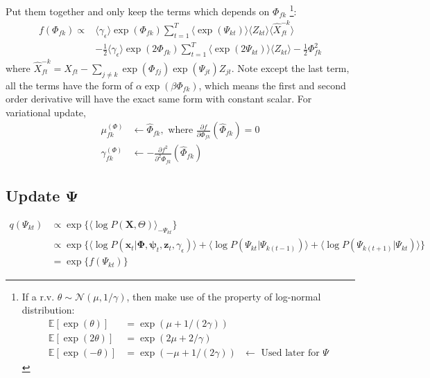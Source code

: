 \documentclass[11pt]{article} %
\begin{document}
Put them together and only keep the terms which depends on $\Phi_{fk}$ \footnote{If a r.v. $\theta \sim \mathcal{N}(\mu, 1/\gamma)$, then make use of the property of log-normal distribution:
\begin{align*}
\mathbb{E}[\exp(\theta)]  &= \exp(\mu + 1/(2\gamma))\\
\mathbb{E}[\exp(2\theta)] &= \exp(2\mu + 2/\gamma)\\
\mathbb{E}[\exp(-\theta)] &= \exp(-\mu + 1/(2\gamma)) \text{ $\leftarrow$ Used later for $\Psi$}
\end{align*}
}:
\begin{align*}
f(\Phi_{fk}) \propto & \langle \gamma_{\epsilon} \rangle \exp(\Phi_{fk}) \sum_{t=1}^T \langle \exp(\Psi_{kt}) \rangle \langle Z_{kt} \rangle
\langle \hat{X}_{ft}^{-k} \rangle \\
& -\frac{1}{2}  \langle \gamma_{\epsilon} \rangle \exp(2\Phi_{fk}) \sum_{t=1}^T \langle \exp(2\Psi_{kt}) \rangle \langle Z_{kt} \rangle - \frac{1}{2}\Phi_{fk}^2
\end{align*}
where $\hat{X}_{ft}^{-k}  = X_{ft} - \sum_{j\neq k}  \exp(\Phi_{fj}) \exp(\Psi_{jt}) Z_{jt}$. Note except the last term, all the terms have the form of $\alpha\exp(\beta \Phi_{fk})$, which means the first and second order derivative will have the exact same form with constant scalar. For variational update,
\begin{align*}
\mu_{fk}^{(\Phi)} &\leftarrow \hat{\Phi}_{fk}, \text{ where }  \frac{\partial f}{\partial \Phi_{fk}} (\hat{\Phi}_{fk}) = 0 \\
\gamma_{fk}^{(\Phi)} &\leftarrow -\frac{\partial f^2}{\partial^2 \Phi_{fk}} (\hat{\Phi}_{fk})
\end{align*}


\subsection{Update $\mathbf{\Psi}$}
\begin{align*}
q(\Psi_{kt}) &\propto \exp\{\langle\log P(\mathbf{X}, \Theta)\rangle_{-\Psi_{kt}}\}\\
&\propto \exp\{\langle \log P(\bm{x}_t | \mathbf{\Phi}, \bm{\psi}_t, \mathbf{z}_t, \gamma_\epsilon)\rangle + \langle \log P(\Psi_{kt} | \Psi_{k(t-1)}) \rangle + \langle \log P(\Psi_{k(t+1)} | \Psi_{kt}) \rangle\}\\
&= \exp\{f(\Psi_{kt})\}
\end{align*}
\end{document}

